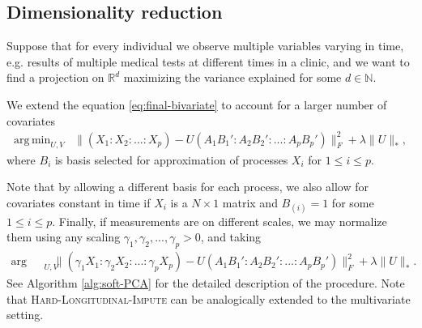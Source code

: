 \documentclass[preprint]{imsart}
\numberwithin{equation}{section}
\theoremstyle{plain}
\newcommand{\R}{\mathbb{R}}
\newcommand{\N}{\mathbb{N}}
\DeclareMathOperator*{\argmin}{arg\,min}
\begin{document}
\subsection{Dimensionality reduction}\label{ss:dim-red}

Suppose that for every individual we observe multiple variables varying in time, e.g. results of multiple medical tests at different times in a clinic, and we want to find a projection on $\R^d$ maximizing the variance explained for some $d \in \N$. %

We extend the equation \eqref{eq:final-bivariate} to account for a larger number of covariates
\begin{align*}%
\argmin_{U,V} &\| (X_1:X_2:...:X_p) - U (A_1B_1':A_2B_2':...:A_pB_p') \|_F^2 + \lambda\|U\|_*,
\end{align*}
where $B_{i}$ is basis selected for approximation of processes $X_{i}$ for $1 \leq i \leq p$. 

Note that by allowing a different basis for each process, we also allow for covariates constant in time if $X_i$ is a $N\times 1$ matrix and $B_{(i)} = 1$ for some $1 \leq i \leq p$.
Finally, if measurements are on different scales, we may normalize them using any scaling $\gamma_1, \gamma_2,..., \gamma_p > 0$, and taking
\begin{align*}%
\argmin_{U,V} &\| (\gamma_1 X_{1}:\gamma_2 X_{2}:...:\gamma_p X_{p}) - U (A_1B_1':A_2B_2':...:A_pB_p') \|_F^2 + \lambda\|U\|_*.
\end{align*}
See Algorithm \ref{alg:soft-PCA} for the detailed description of the procedure. Note that \textsc{Hard-Longitudinal-Impute} can be analogically extended to the multivariate setting. %
\end{document}
